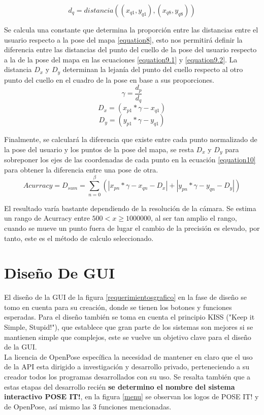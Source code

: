 \begin{equation}
d_q= distancia((x_{q1},y_{q1}),(x_{q8},y_{q8}))
\label{equation7.2}
\end{equation}

Se calcula una constante que determina la proporción entre las distancias entre el usuario respecto a la pose del mapa \ref{equation8}, esto nos permitirá definir la diferencia entre las distancias del punto del cuello de la pose del usuario respecto a la de la pose del mapa en las ecuaciones \ref{equation9.1} y \ref{equation9.2}. La distancia $D_x$ y $D_y$ determinan la lejanía del punto del cuello respecto al otro punto del cuello en el cuadro de la pose en base a sus proporciones.
\begin{equation}
\gamma = \frac{d_p}{d_q}
\label{equation8}
\end{equation}
\begin{equation}
D_x= (x_{p1}*\gamma - x_{q1})
\label{equation9.1}
\end{equation}
\begin{equation}
D_y= (y_{p1}*\gamma - y_{q1})
\label{equation9.2}
\end{equation}

Finalmente, se calculará la diferencia que existe entre cada punto normalizado de la pose del usuario y los puntos de la pose del mapa, se resta $D_x$ y $D_y$ para sobreponer los ejes de las coordenadas de cada punto en la ecuación \ref{equation10} para obtener la diferencia entre una pose de otra. 
\begin{equation}
Acurracy = D_{sum} = \sum_{n=0}^\beta (\left | x_{pn}*\gamma -x_{qn}-D_x \right |+\left | y_{pn}*\gamma -y_{qn}-D_y \right |) 
\label{equation10}
\end{equation}

El resultado varía bastante dependiendo de la resolución de la cámara. Se estima un rango de Acurracy entre $ 500 < x \geq 1000000$, al ser tan amplio el rango, cuando se mueve un punto fuera de lugar el cambio de la precisión es elevado, por tanto, este es el método de calculo seleccionado.



\section{Diseño De GUI}

El diseño de la GUI de la figura \ref{requerimientosgrafico} en la fase de diseño se tomo en cuenta para su creación, donde se tienen los botones y funciones esperadas. Para el diseño también se toma en cuenta el principio KISS ("Keep it Simple, Stupid!"), que establece que gran parte de los sistemas son mejores si se mantienen simple que complejos, este se vuelve un objetivo clave para el diseño de la GUI.
\\
La licencia de OpenPose específica la necesidad de mantener en claro que el uso de la API esta dirigido a investigación y desarrollo privado, perteneciendo a su creador todos los programas desarrollados con su uso.
Se resalta también que a estas etapas del desarrollo recién \textbf{se determino el nombre del sistema interactivo POSE IT!}, en la figura \ref{menu} se observan los logos de POSE IT! y de OpenPose, así mismo las 3 funciones mencionadas.

